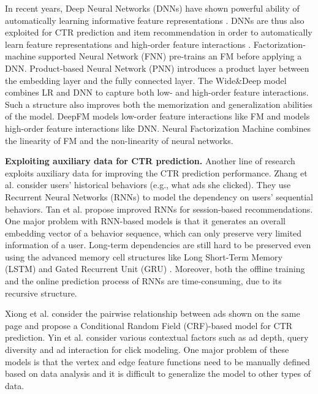 \documentclass[sigconf]{acmart}
\begin{document}
In recent years, Deep Neural Networks (DNNs) have shown powerful ability of automatically learning informative feature representations \cite{lecun2015deep}. DNNs are thus also exploited for CTR prediction and item recommendation in order to automatically learn feature representations and high-order feature interactions \cite{van2013deep,covington2016deep,wang2017deep}. Factorization-machine supported Neural Network (FNN) \cite{zhang2016deep} pre-trains an FM before applying a DNN. Product-based Neural Network (PNN) \cite{qu2016product} introduces a product layer between the embedding layer and the fully connected layer. The Wide\&Deep model \cite{cheng2016wide} combines LR and DNN to capture both low- and high-order feature interactions. Such a structure also improves both the memorization and generalization abilities of the model. DeepFM \cite{guo2017deepfm} models low-order feature interactions like FM and models high-order feature interactions like DNN. Neural Factorization Machine \cite{he2017neural} combines the linearity of FM and the non-linearity of neural networks.

\textbf{Exploiting auxiliary data for CTR prediction.}
Another line of research exploits auxiliary data for improving the CTR prediction performance.
Zhang et al. \cite{zhang2014sequential} consider users' historical behaviors (e.g., what ads she clicked). They use Recurrent Neural Networks (RNNs) to model the dependency on users' sequential behaviors. Tan et al. \cite{tan2016improved} propose improved RNNs for session-based recommendations. One major problem with RNN-based models is that it generates an overall embedding vector of a behavior sequence, which can only preserve very limited information of a user. Long-term dependencies are still hard to be preserved even using the advanced memory cell structures like Long Short-Term Memory (LSTM) \cite{hochreiter1997long} and Gated Recurrent Unit (GRU) \cite{chung2014empirical}. Moreover, both the offline training and the online prediction process of RNNs are time-consuming, due to its recursive structure.

Xiong et al. \cite{xiong2012relational} consider the pairwise relationship between ads shown on the same page and propose a Conditional Random Field (CRF)-based model for CTR prediction. Yin et al. \cite{yin2014exploiting} consider various contextual factors such as ad depth, query diversity and ad interaction for click modeling. One major problem of these models is that the vertex and edge feature functions need to be manually defined based on data analysis and it is difficult to generalize the model to other types of data.
\end{document}
